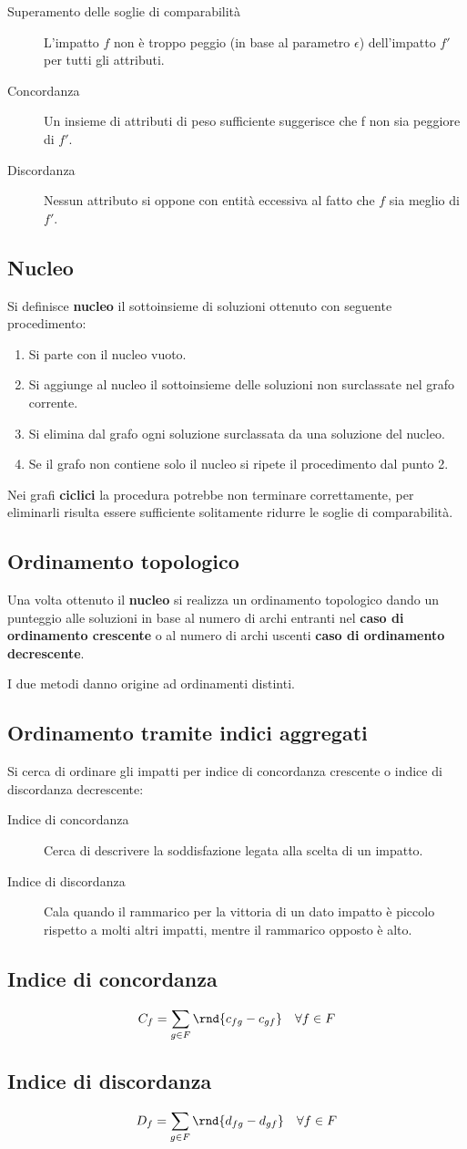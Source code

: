 \documentclass[\main/main.tex]{subfiles}
\begin{document}
\begin{description}
  \item[Superamento delle soglie di comparabilità] L'impatto $f$ non è troppo peggio (in base al parametro $\epsilon$) dell'impatto $f'$ per tutti gli attributi.
  \item[Concordanza] Un insieme di attributi di peso sufficiente suggerisce che f non sia peggiore di $f'$.
  \item[Discordanza] Nessun attributo si oppone con entità eccessiva al fatto che $f$ sia meglio di $f'$.
\end{description}

\subsection{Nucleo}
Si definisce \textbf{nucleo} il sottoinsieme di soluzioni ottenuto con seguente procedimento:
\begin{enumerate}
  \item Si parte con il nucleo vuoto.
  \item Si aggiunge al nucleo il sottoinsieme delle soluzioni non surclassate nel grafo corrente.
  \item Si elimina dal grafo ogni soluzione surclassata da una soluzione del nucleo.
  \item Se il grafo non contiene solo il nucleo si ripete il procedimento dal punto 2.
\end{enumerate}
Nei grafi \textbf{ciclici} la procedura potrebbe non terminare correttamente, per eliminarli risulta essere sufficiente solitamente ridurre le soglie di comparabilità.

\subsection{Ordinamento topologico}
Una volta ottenuto il \textbf{nucleo} si realizza un ordinamento topologico dando un punteggio alle soluzioni in base al numero di archi entranti nel \textbf{caso di ordinamento crescente} o al numero di archi uscenti \textbf{caso di ordinamento decrescente}.

I due metodi danno origine ad ordinamenti distinti.

\subsection{Ordinamento tramite indici aggregati}
Si cerca di ordinare gli impatti per indice di concordanza crescente o indice di discordanza decrescente:
\begin{description}
  \item[Indice di concordanza] Cerca di descrivere la soddisfazione legata alla scelta di un impatto.
  \item[Indice di discordanza] Cala quando il rammarico per la vittoria di un dato impatto è piccolo rispetto a molti altri impatti, mentre il rammarico opposto è alto.
\end{description}

\subsection{Indice di concordanza}
\[
  C_f = \sum_{g\in F} \rnd{c_{fg} - c_{gf}} \quad \forall f \in F
\]
\subsection{Indice di discordanza}
\[
  D_f = \sum_{g\in F} \rnd{d_{fg} - d_{gf}} \quad \forall f \in F
\]
\end{document}
